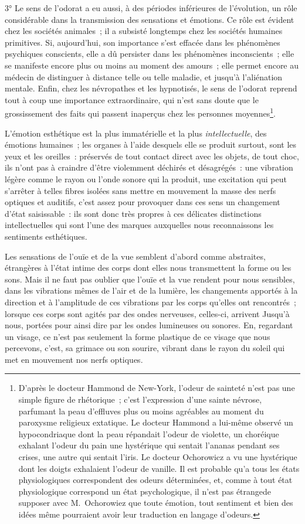 \documentclass[french,twoside]{book} %
\begin{document}
3° Le sens de l’odorat a eu aussi, à des périodes inférieures de l’évolution, un rôle considérable dans la transmission des sensations et émotions. Ce rôle est évident chez les sociétés animales ; il a subsisté longtemps chez les sociétés humaines primitives. Si, aujourd’hui, son importance s’est effacée dans les phénomènes psychiques conscients, elle a dû persister dans les phénomènes inconscients ; elle se manifeste encore plus ou moins au moment des amours ; elle permet encore au médecin de distinguer à distance telle ou telle maladie, et jusqu’à l’aliénation mentale. Enfin, chez les névropathes et les hypnotisés, le sens de l’odorat reprend tout à coup une importance extraordinaire, qui n’est sans doute que le grossissement des faits qui passent inaperçus chez les personnes moyennes\footnote{ D’après le docteur Hammond de New-York, l’odeur de sainteté n’est pas une simple figure de rhétorique ; c’est l’expression d’une sainte névrose, parfumant la peau d’effluves plus ou moins agréables au moment du paroxysme religieux extatique. Le docteur Hammond a lui-même observé un hypocondriaque dont la peau répandait l’odeur de violette, un choréique exhalant l’odeur du pain une hystérique qui sentait l’ananas pendant ses crises, une autre qui sentait l’iris. Le docteur Ochorowicz a vu une hystérique dont les doigts exhalaient l’odeur de vanille. Il est probable qu’a tous les états physiologiques correspondent des odeurs déterminées, et, comme à tout état physiologique correspond un état psychologique, il n’est pas étrangede supposer avec M. Ochorowiez que toute émotion, tout sentiment et bien des idées même pourraient avoir leur traduction en langage d’odeurs.}.\par
L’émotion esthétique est la plus immatérielle et la plus \emph{intellectuelle}, des émotions humaines ; les organes à l’aide desquels elle se produit surtout, sont les yeux et les oreilles : préservés de tout contact direct avec les objets, de tout choc, ils n’ont pas à craindre d’être violemment déchirés et désagrégés : une vibration légère comme le rayon ou l’onde sonore qui la produit, une excitation qui peut s’arrêter à telles fibres isolées sans mettre en mouvement la masse des nerfs optiques et auditifs, c’est assez pour provoquer dans ces sens un changement d’état saisissable : ils sont donc très propres à ces délicates distinctions intellectuelles qui sont l’une des marques auxquelles nous reconnaissons les sentiments esthétiques.\par
Les sensations de l’ouïe et de la vue semblent d’abord comme abstraites, étrangères à l’état intime des corps dont elles nous transmettent la forme ou les sons. Mais il ne faut pas oublier que l’ouïe et la vue rendent pour nous sensibles, dans les vibrations mêmes de l’air et de la lumière, les changements apportés à la direction et à l’amplitude de ces vibrations par les corps qu’elles ont rencontrés ; lorsque ces corps sont agités par des ondes nerveuses, celles-ci, arrivent Jusqu’à nous, portées pour ainsi dire par les ondes lumineuses ou sonores. En, regardant un visage, ce n’est pas seulement la forme plastique de ce visage que nous percevons, c’est, sa grimace ou son sourire, vibrant dans le rayon du soleil qui met en mouvement nos nerfs optiques.\par
\end{document}
